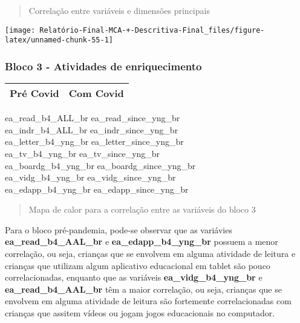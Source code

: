 \documentclass[
]{article}
\begin{document}
\begin{quote}
Correlação entre variáveis e dimensões principais
\end{quote}

\begin{center}\texttt{[image: Relatório-Final-MCA-+-Descritiva-Final\_files/figure-latex/unnamed-chunk-55-1]} \end{center}

\hypertarget{bloco-3---atividades-de-enriquecimento}{%
\subsubsection{\texorpdfstring{\textbf{Bloco 3 - Atividades de
enriquecimento}}{Bloco 3 - Atividades de enriquecimento}}\label{bloco-3---atividades-de-enriquecimento}}

\begin{longtable}[]{@{}ll@{}}
\toprule
Pré Covid & Com Covid\tabularnewline
\midrule
\endhead
\bottomrule
\end{longtable}

ea\_read\_b4\_ALL\_br \textbar{} ea\_read\_since\_yng\_br \textbar{}\\
ea\_indr\_b4\_ALL\_br \textbar{} ea\_indr\_since\_yng\_br \textbar{}\\
ea\_letter\_b4\_yng\_br \textbar{} ea\_letter\_since\_yng\_br
\textbar{}\\
ea\_tv\_b4\_yng\_br \textbar{} ea\_tv\_since\_yng\_br \textbar{}\\
ea\_boardg\_b4\_yng\_br \textbar{} ea\_boardg\_since\_yng\_br
\textbar{}\\
ea\_vidg\_b4\_yng\_br \textbar{} ea\_vidg\_since\_yng\_br \textbar{}\\
ea\_edapp\_b4\_yng\_br \textbar{} ea\_edapp\_since\_yng\_br \textbar{}

\begin{quote}
Mapa de calor para a correlação entre as variáveis do bloco 3
\end{quote}

Para o bloco pré-pandemia, pode-se observar que as variávies
\textbf{ea\_read\_b4\_AAL\_br} e \textbf{ea\_edapp\_b4\_yng\_br} possuem
a menor correlação, ou seja, crianças que se envolvem em alguma
atividade de leitura e crianças que utilizam algum aplicativo
educacional em tablet são pouco correlacionadas, enquanto que as
variáveis \textbf{ea\_vidg\_b4\_yng\_br} e
\textbf{ea\_read\_b4\_AAL\_br} têm a maior correlação, ou seja, crianças
que se envolvem em alguma atividade de leitura são fortemente
correlacionadas com crianças que assitem vídeos ou jogam jogos
educacionais no computador.
\end{document}
